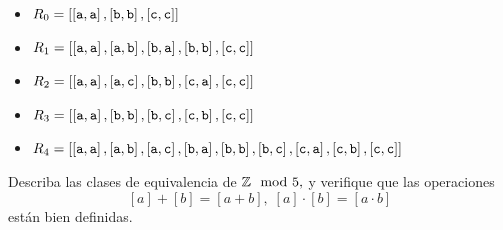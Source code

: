 	\begin{itemize}
		\item $\displaystyle R_{0}= \left[\left[\text{\texttt{a}}, \text{\texttt{a}}\right], \left[\text{\texttt{b}}, \text{\texttt{b}}\right], \left[\text{\texttt{c}}, \text{\texttt{c}}\right]\right] $
		\item $\displaystyle R_{1}= \left[\left[\text{\texttt{a}}, \text{\texttt{a}}\right], \left[\text{\texttt{a}}, \text{\texttt{b}}\right], \left[\text{\texttt{b}}, \text{\texttt{a}}\right], \left[\text{\texttt{b}}, \text{\texttt{b}}\right], \left[\text{\texttt{c}}, \text{\texttt{c}}\right]\right] $
		\item $\displaystyle R_{2}= \left[\left[\text{\texttt{a}}, \text{\texttt{a}}\right], \left[\text{\texttt{a}}, \text{\texttt{c}}\right], \left[\text{\texttt{b}}, \text{\texttt{b}}\right], \left[\text{\texttt{c}}, \text{\texttt{a}}\right], \left[\text{\texttt{c}}, \text{\texttt{c}}\right]\right] $
		\item $\displaystyle R_{3}= \left[\left[\text{\texttt{a}}, \text{\texttt{a}}\right], \left[\text{\texttt{b}}, \text{\texttt{b}}\right], \left[\text{\texttt{b}}, \text{\texttt{c}}\right], \left[\text{\texttt{c}}, \text{\texttt{b}}\right], \left[\text{\texttt{c}}, \text{\texttt{c}}\right]\right] $
		\item $\displaystyle R_{4}= \left[\left[\text{\texttt{a}}, \text{\texttt{a}}\right], \left[\text{\texttt{a}}, \text{\texttt{b}}\right], \left[\text{\texttt{a}}, \text{\texttt{c}}\right], \left[\text{\texttt{b}}, \text{\texttt{a}}\right], \left[\text{\texttt{b}}, \text{\texttt{b}}\right], \left[\text{\texttt{b}}, \text{\texttt{c}}\right], \left[\text{\texttt{c}}, \text{\texttt{a}}\right], \left[\text{\texttt{c}}, \text{\texttt{b}}\right], \left[\text{\texttt{c}}, \text{\texttt{c}}\right]\right] $
		
	\end{itemize}
	




\begin{exmp}
\label{lip:exmp:2.13.b}
Describa las clases de equivalencia de $\mathbb{Z} \mod 5,$ y verifique que las operaciones
$$
[a]+[b]=[a+b], \; [a]\cdot[b]=[a \cdot b]
$$ est\'an bien definidas.   
\end{exmp}





